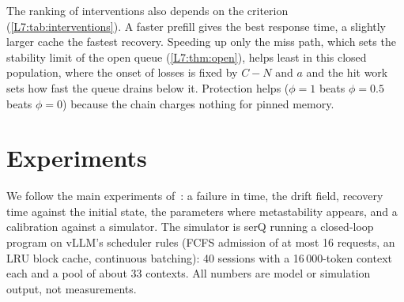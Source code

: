 \begin{table}[h]\centering\small
\metaBurstTable
\caption{Queue-and-cache chain, think time 27\,s and 12\,s during the burst.}\label{L7:tab:burst}
\end{table}

The ranking of interventions also depends on the criterion (\cref{L7:tab:interventions}).
A faster prefill gives the best response time, a slightly larger cache the fastest
recovery. Speeding up only the miss path, which sets the stability limit of the open
queue (\cref{L7:thm:open}), helps least in this closed population, where the onset of
losses is fixed by $C-N$ and $a$ and the hit work sets how fast the queue drains below it.
Protection helps ($\phi=1$ beats $\phi=0.5$ beats $\phi=0$) because the chain charges
nothing for pinned memory.

\begin{table}[h]\centering\small
\metaInterventionTable
\caption{Queue-and-cache chain: the base chain and six single changes. Exact stationary
laws and mean hitting times.}\label{L7:tab:interventions}
\end{table}

\section{Experiments}\label{L7:sec:experiments}

We follow the main experiments of~\cite{alvaro2025}: a failure in time, the drift field,
recovery time against the initial state, the parameters where metastability appears,
and a calibration against a simulator.
The simulator is serQ running a closed-loop program on vLLM's scheduler rules (FCFS
admission of at most 16 requests, an LRU block cache, continuous batching): 40 sessions
with a 16\,000-token context each and a pool of about 33 contexts. All numbers are model
or simulation output, not measurements.


